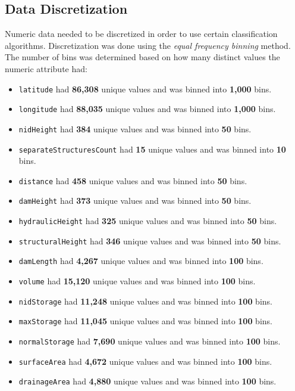 \documentclass{article}
\begin{document}
\subsection{Data Discretization}
Numeric data needed to be discretized in order to use certain classification algorithms. Discretization was done using the \textit{equal frequency binning} method. The number of bins was determined based on how many distinct values the numeric attribute had:
\begin{itemize}
    \item \texttt{latitude} had \textbf{86,308} unique values and was binned into \textbf{1,000} bins.
    \item \texttt{longitude} had \textbf{88,035} unique values and was binned into \textbf{1,000} bins.
    \item \texttt{nidHeight} had \textbf{384} unique values and was binned into \textbf{50} bins.
    \item \texttt{separateStructuresCount} had \textbf{15} unique values and was binned into \textbf{10} bins.
    \item \texttt{distance} had \textbf{458} unique values and was binned into \textbf{50} bins.
    \item \texttt{damHeight} had \textbf{373} unique values and was binned into \textbf{50} bins.
    \item \texttt{hydraulicHeight} had \textbf{325} unique values and was binned into \textbf{50} bins.
    \item \texttt{structuralHeight} had \textbf{346} unique values and was binned into \textbf{50} bins.
    \item \texttt{damLength} had \textbf{4,267} unique values and was binned into \textbf{100} bins.
    \item \texttt{volume} had \textbf{15,120} unique values and was binned into \textbf{100} bins.
    \item \texttt{nidStorage} had \textbf{11,248} unique values and was binned into \textbf{100} bins.
    \item \texttt{maxStorage} had \textbf{11,045} unique values and was binned into \textbf{100} bins.
    \item \texttt{normalStorage} had \textbf{7,690} unique values and was binned into \textbf{100} bins.
    \item \texttt{surfaceArea} had \textbf{4,672} unique values and was binned into \textbf{100} bins.
    \item \texttt{drainageArea} had \textbf{4,880} unique values and was binned into \textbf{100} bins.

\end{itemize}
\end{document}
